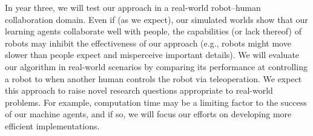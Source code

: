 In year three, we will test our approach in a real-world 
robot--human collaboration domain.  Even if (as we expect), our simulated worlds
show that our
learning agents collaborate well with people, the capabilities (or lack thereof) of robots may inhibit the
effectiveness of our approach (e.g., robots might move slower than
people expect and misperceive important details). We will evaluate our algorithm in real-world scenarios
by comparing its performance at controlling a robot to when another
human controls the robot via teleoperation. We expect this approach to raise
novel research questions appropriate to real-world problems. For example, computation
time may be a limiting factor to the success of our machine agents,
and if so, we will focus our efforts on  developing more efficient implementations.


% 
% 
